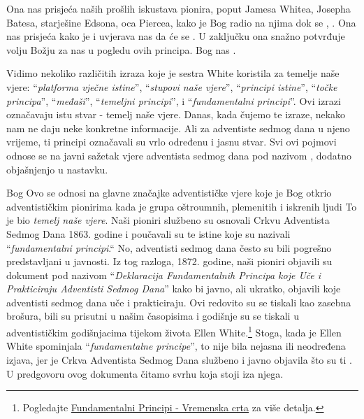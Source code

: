 Ona nas prisjeća naših prošlih iskustava pionira, poput Jamesa Whitea, Josepha Batesa, starješine Edsona, oca Piercea, kako je Bog radio na njima dok se , . Ona nas prisjeća kako je  i uvjerava nas da će se . U zaključku ona snažno potvrđuje volju Božju za nas u pogledu ovih principa. Bog nas .

Vidimo nekoliko različitih izraza koje je sestra White koristila za temelje naše vjere: “\textit{platforma vječne istine}”, “\textit{stupovi naše vjere}”, “\textit{principi istine}”, “\textit{točke principa}”, “\textit{međaši}”, “\textit{temeljni principi}”, i “\textit{fundamentalni principi}”. Ovi izrazi označavaju istu stvar - temelj naše vjere. Danas, kada čujemo te izraze, nekako nam ne daju neke konkretne informacije. Ali za adventiste sedmog dana u njeno vrijeme, ti principi označavali su vrlo određenu i jasnu stvar. Svi ovi pojmovi odnose se na javni sažetak vjere adventista sedmog dana pod nazivom , dodatno objašnjenjo u nastavku.

Bog  Ovo se odnosi na glavne značajke adventističke vjere koje je Bog otkrio adventističkim pionirima  kada je grupa oštroumnih, plemenitih i iskrenih ljudi  To je bio \textit{temelj naše vjere}. Naši pioniri službeno su osnovali Crkvu Adventista Sedmog Dana 1863. godine i poučavali su te istine koje su nazivali “\textit{fundamentalni principi}.“ No, adventisti sedmog dana često su bili pogrešno predstavljani u javnosti. Iz tog razloga, 1872. godine, naši pioniri objavili su dokument pod nazivom “\textit{Deklaracija Fundamentalnih Principa koje Uče i Prakticiraju Adventisti Sedmog Dana}” kako bi javno, ali ukratko, objavili koje  adventisti sedmog dana uče i prakticiraju. Ovi  redovito su se tiskali kao zasebna brošura, bili su prisutni u našim časopisima i godišnje su se tiskali u adventističkim godišnjacima tijekom života Ellen White.\footnote{Pogledajte \hyperref[appendix:timeline]{Fundamentalni Principi - Vremenska crta} za više detalja.} Stoga, kada je Ellen White spominjala “\textit{fundamentalne principe}”, to nije bila nejasna ili neodređena izjava, jer je Crkva Adventista Sedmog Dana službeno i javno objavila što su ti . U predgovoru ovog dokumenta čitamo svrhu koja stoji iza njega.

